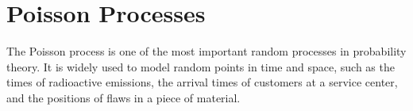 \section{Poisson Processes}
The Poisson process is one of the most important random processes in probability theory. It is widely used to model random points in time and space, such as the times of radioactive emissions, the arrival times of customers at a service center, and the positions of flaws in a piece of material.
